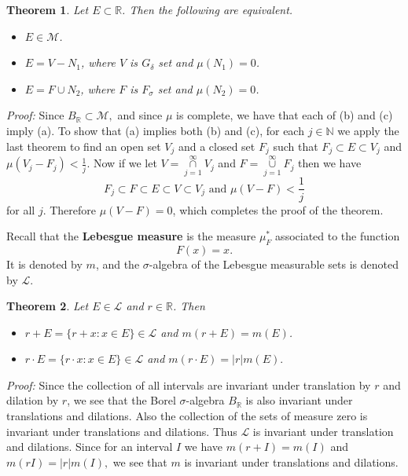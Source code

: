 \documentclass[12pt]{report}
\newtheorem{theorem}{Theorem}[section]
\begin{document}
\begin{theorem}
 Let $E \subset \mathbb{R}$.  Then the following
are equivalent.
\begin{itemize}
\item[(a)]  $E \in \mathcal{M}$.
\item[(b)]  $E = V - N_1$, where $V$ is $G_\delta$ set and
$\mu(N_1) = 0$.
\item[(c)]  $E = F \cup N_2$, where $F$ is $F_\sigma$ set and
$\mu(N_2) = 0$.
\end{itemize}
\end{theorem}
{\em Proof:}  Since $B_{\mathbb{R}} \subset \mathcal{M},$ and
since $\mu$ is complete,  we have that each of (b) and (c) imply (a).  To
show that (a) implies both (b) and (c), for each $j \in \mathbb{N}$ we apply
the last theorem to find an open set $V_j$ and a closed set $F_j$ such that
$F_j \subset E \subset V_j$ and $\mu(V_j - F_j) < \frac{1}{j}$.  Now if we let
$V = \overset{\infty}{\underset{j=1}{\cap}} V_j$ and
$F =
\overset{\infty}{\underset{j=1}{\cup}}  F_j$ then we have 
\[ F_j \subset F \subset E \subset V \subset V_j \mbox{ and } \mu(V- F) <
\frac{1}{j}
\] for all $j$.   Therefore $\mu(V-F) = 0$, which completes the proof of the
theorem.

\medskip
\noindent 
Recall that the {\bf  Lebesgue measure} is the measure
$\mu^*_F$ associated to the function 
\[ F(x) = x.
\] It is denoted by $m$, and the $\sigma$-algebra of the Lebesgue
measurable sets is denoted by $\mathcal{L}$.


\begin{theorem} Let $E \in \mathcal{L}$ and $r \in \mathbb{R}$. 
Then
\begin{itemize}
\item[(a)] $r + E = \{r + x: x \in E \} \in \mathcal{L} $ and $ m(r + E)
= m(E)$.
\item[(b)] $r \cdot E = \{r \cdot x: x \in E\} \in \mathcal{L}$ and
$m(r \cdot E) = |r|m(E).$
\end{itemize}
\end{theorem}
 {\em Proof:}  Since the collection of all intervals are invariant
under translation by $r$ and dilation by $r$, we see that the Borel
$\sigma$-algebra $B_{\mathbb{R}}$ is also invariant under translations and
dilations.  Also the collection of the sets of measure zero is invariant
under translations and dilations.  Thus $\mathcal{L}$ is invariant under
translation and dilations.  Since for an interval $I$ we have $m(r + I) =
m(I)$ and $m(rI) = |r|m(I),$ we see that $m$ is invariant under translations
and dilations.
\end{document}
